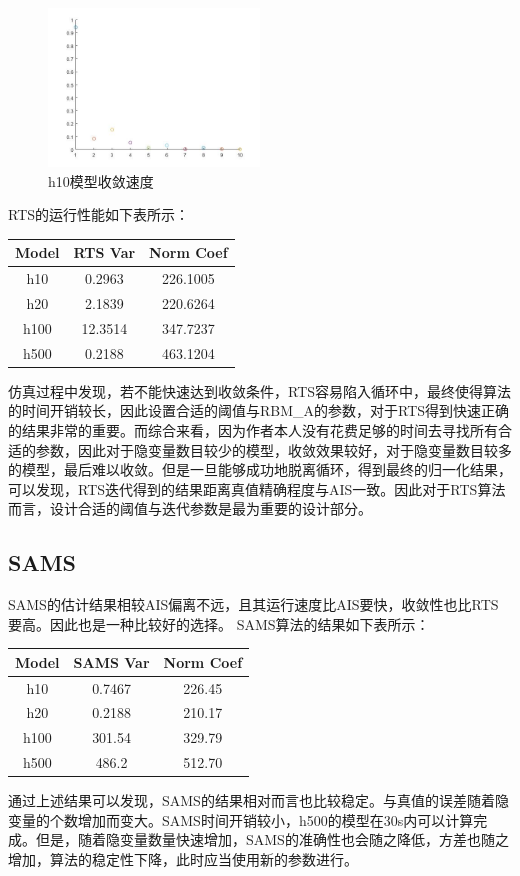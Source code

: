 \documentclass[journal,a4paper]{IEEEtran}
\begin{document}
		\begin{figure}[h]
			\includegraphics[width = 0.5\textwidth]{6.jpg}
			\caption{h10模型收敛速度}
			\label{fig6}
		\end{figure}
	
		RTS的运行性能如下表所示：
		\begin{center}
		\begin{tabular}{c|cc}
	\hline
	Model & RTS Var & Norm Coef \\
	\hline
	h10 & 0.2963 & 226.1005\\
	h20 & 2.1839 & 220.6264\\
	h100 & 12.3514 & 347.7237\\
	h500 & 0.2188 & 463.1204\\
	\hline
\end{tabular}
		\end{center}
		
		仿真过程中发现，若不能快速达到收敛条件，RTS容易陷入循环中，最终使得算法的时间开销较长，因此设置合适的阈值与RBM\_A的参数，对于RTS得到快速正确的结果非常的重要。而综合来看，因为作者本人没有花费足够的时间去寻找所有合适的参数，因此对于隐变量数目较少的模型，收敛效果较好，对于隐变量数目较多的模型，最后难以收敛。但是一旦能够成功地脱离循环，得到最终的归一化结果，可以发现，RTS迭代得到的结果距离真值精确程度与AIS一致。因此对于RTS算法而言，设计合适的阈值与迭代参数是最为重要的设计部分。
		
	\subsection{SAMS}
		SAMS的估计结果相较AIS偏离不远，且其运行速度比AIS要快，收敛性也比RTS要高。因此也是一种比较好的选择。
		SAMS算法的结果如下表所示：
		\begin{center}
		\begin{tabular}{c|cc}
			\hline
			Model & SAMS Var & Norm Coef\\
			\hline
			h10 & 0.7467 &   226.45 \\
			h20 & 0.2188 & 210.17 \\
			h100 & 301.54 & 329.79\\
			h500 & 486.2 & 512.70\\
			\hline
		\end{tabular}
	\end{center}
		通过上述结果可以发现，SAMS的结果相对而言也比较稳定。与真值的误差随着隐变量的个数增加而变大。SAMS时间开销较小，h500的模型在30s内可以计算完成。但是，随着隐变量数量快速增加，SAMS的准确性也会随之降低，方差也随之增加，算法的稳定性下降，此时应当使用新的参数进行。
		
\end{document}
